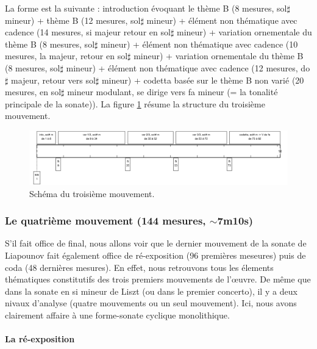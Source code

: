 La forme est la suivante : introduction évoquant le thème B (8 mesures, sol$\sharp$ mineur) + thème B (12 mesures, sol$\sharp$ mineur) + élément non thématique avec cadence (14 mesures, si majeur retour en sol$\sharp$ mineur) + variation ornementale du thème B (8 mesures, sol$\sharp$ mineur) + élément non thématique avec cadence (10 mesures, la majeur, retour en sol$\sharp$ mineur) + variation ornementale du thème B (8 mesures, sol$\sharp$ mineur) + élément non thématique avec cadence (12 mesures, do$\sharp$ majeur, retour vers sol$\sharp$ mineur) + codetta basée sur le thème B non varié (20 mesures, en sol$\sharp$ mineur modulant, se dirige vers fa mineur (= la tonalité principale de la sonate)). La figure \ref{schema-3} résume la structure du troisième mouvement.

\begin{figure}[!ht]
  \begin{bigcenter}
    \includegraphics[width=17.5cm, keepaspectratio]{frise-mvt3.png}
  \end{bigcenter}
  \caption{\label{schema-3}Schéma du troisième mouvement.}
\end{figure}

\subsubsection*{Le quatrième mouvement (144 mesures, $\sim$7m10s)}

S'il fait office de final, nous allons voir que le dernier mouvement de la sonate de Liapounov fait également office de ré-exposition (96 premières meseures) puis de coda (48 dernières mesures). En effet, nous retrouvons tous les élements thématiques constitutifs des trois premiers mouvements de l'œuvre. De même que dans la sonate en si mineur de Liszt (ou dans le premier concerto), il y a deux nivaux d'analyse (quatre mouvements ou un seul mouvement). Ici, nous avons clairement affaire à une forme-sonate cyclique monolithique.

\paragraph{La ré-exposition}

